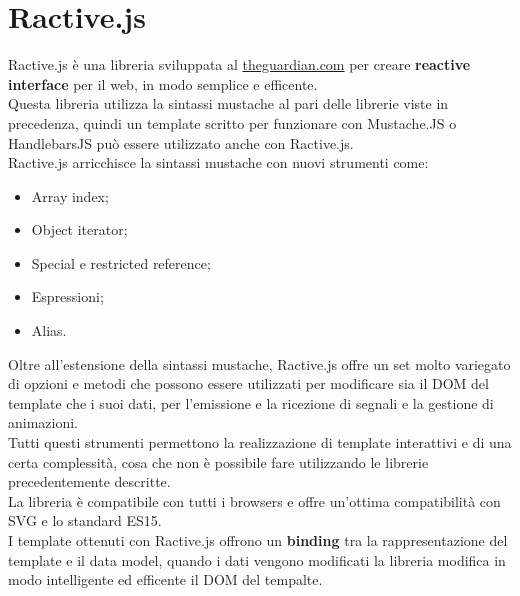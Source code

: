 \section{Ractive.js}
Ractive.js è una libreria sviluppata al \href{https://www.theguardian.com}{theguardian.com} per creare \textbf{reactive interface} per il web, in modo semplice e efficente.\\
Questa libreria utilizza la sintassi mustache al pari delle librerie viste in precedenza, quindi un template scritto per funzionare con Mustache.JS o HandlebarsJS può essere utilizzato anche con Ractive.js.\\
Ractive.js arricchisce la sintassi mustache con nuovi strumenti come:
\begin{itemize}
	\item Array index;
	\item Object iterator;
	\item Special e restricted reference;
	\item Espressioni;
	\item Alias.
\end{itemize}
Oltre all'estensione della sintassi mustache, Ractive.js offre un set molto variegato di opzioni e metodi che possono essere utilizzati per modificare sia il DOM del template che i suoi dati,  per l'emissione e la ricezione di segnali e la gestione di animazioni.\\
Tutti questi strumenti permettono la realizzazione di template interattivi e di una certa complessità, cosa che non è possibile fare utilizzando le librerie precedentemente descritte.\\
La libreria è compatibile con tutti i browsers e offre un'ottima compatibilità con SVG e lo standard ES15.\\
I template ottenuti con Ractive.js  offrono un \textbf{binding} tra la rappresentazione del template e  il data model, quando i dati vengono modificati la libreria modifica in modo intelligente ed efficente il DOM del tempalte.

